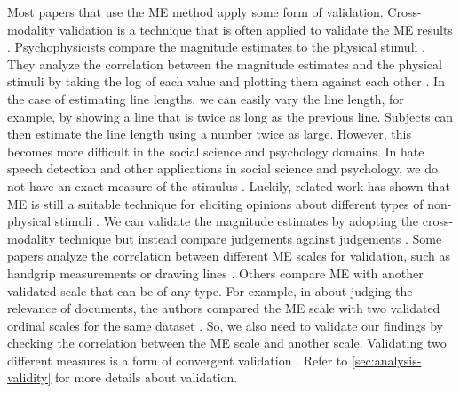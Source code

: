\documentclass[a4paper]{article}
\begin{document}
Most papers that use the ME method apply some form of validation. Cross-modality validation is a technique that is often applied to validate the ME results \cite{bard1996magnitude}. Psychophysicists compare the magnitude estimates to the physical stimuli \cite{bard1996magnitude}. They analyze the correlation between the magnitude estimates and the physical stimuli by taking the log of each value and plotting them against each other \cite{bard1996magnitude}. In the case of estimating line lengths, we can easily vary the line length, for example, by showing a line that is twice as long as the previous line. Subjects can then estimate the line length using a number twice as large. However, this becomes more difficult in the social science and psychology domains. In hate speech detection and other applications in social science and psychology, we do not have an exact measure of the stimulus \cite{bard1996magnitude}. Luckily, related work has shown that ME is still a suitable technique for eliciting opinions about different types of non-physical stimuli \cite{bard1996magnitude, mcgee2004master, maddalena2017crowdsourcing, lodge1979comparisons}. We can validate the magnitude estimates by adopting the cross-modality technique but instead compare judgements against judgements \cite{bard1996magnitude, lodge1979comparisons}. Some papers analyze the correlation between different ME scales for validation, such as handgrip measurements or drawing lines \cite{bard1996magnitude, lodge1976calibration}. Others compare ME with another validated scale that can be of any type. For example, in \cite{maddalena2017crowdsourcing} about judging the relevance of documents, the authors compared the ME scale with two validated ordinal scales for the same dataset \cite{maddalena2017crowdsourcing}. So, we also need to validate our findings by checking the correlation between the ME scale and another scale. Validating two different measures is a form of convergent validation \cite{fitzner2007reliability}. Refer to \ref{sec:analysis-validity} for more details about validation.
\end{document}
